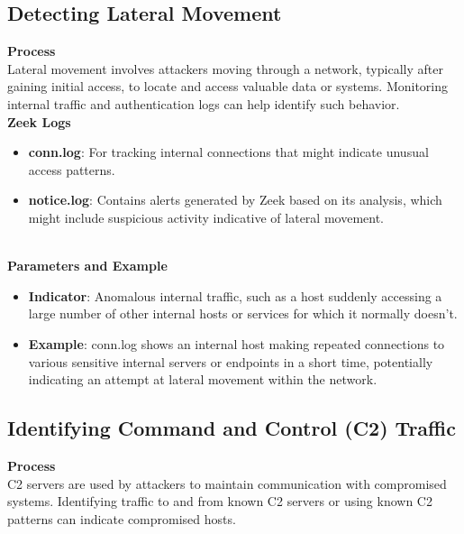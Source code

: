 \vspace{8pt}
\subsection{Detecting Lateral Movement}
\textbf{Process}
\vspace{8pt}
\\
Lateral movement involves attackers moving through a network, typically after gaining initial access, to locate and access valuable data or systems. Monitoring internal traffic and authentication logs can help identify such behavior.
\vspace{10pt}
\\

\noindent \textbf{Zeek Logs}
\begin{itemize}
    \item \textbf{conn.log}: For tracking internal connections that might indicate unusual access patterns.
    \item \textbf{notice.log}: Contains alerts generated by Zeek based on its analysis, which might include suspicious activity indicative of lateral movement.
\end{itemize}
\vspace{10pt}
\\

\noindent \textbf{Parameters and Example}
\begin{itemize}
    \item \textbf{Indicator}: Anomalous internal traffic, such as a host suddenly accessing a large number of other internal hosts or services for which it normally doesn't.
    \item \textbf{Example}: conn.log shows an internal host making repeated connections to various sensitive internal servers or endpoints in a short time, potentially indicating an attempt at lateral movement within the network.
\end{itemize}

\vspace{8pt}
\subsection{Identifying Command and Control (C2) Traffic}
\textbf{Process}
\vspace{8pt}
\\
C2 servers are used by attackers to maintain communication with compromised systems. Identifying traffic to and from known C2 servers or using known C2 patterns can indicate compromised hosts.
\vspace{10pt}
\\

